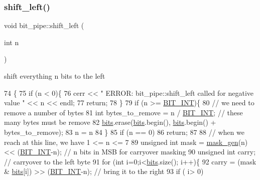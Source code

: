 \subsubsection{\texorpdfstring{shift\+\_\+left()}{shift\_left()}}
{\footnotesize\ttfamily void bit\+\_\+pipe\+::shift\+\_\+left (\begin{DoxyParamCaption}\item[{int}]{n }\end{DoxyParamCaption})}



shift everything n bits to the left 


\begin{DoxyCode}
74                               \{
75   \textcolor{keywordflow}{if} (n < 0)\{
76     cerr << \textcolor{stringliteral}{" ERROR: bit\_pipe::shift\_left called for negative value "} << n << endl;
77     \textcolor{keywordflow}{return};
78   \}
79   \textcolor{keywordflow}{if} (n >= \hyperlink{bitstream_8h_afcadf5aa65c5159bfb96c4d82ebc0a5d}{BIT\_INT})\{
80     \textcolor{comment}{// we need to remove a number of bytes}
81     \textcolor{keywordtype}{int} bytes\_to\_remove = n / \hyperlink{bitstream_8h_afcadf5aa65c5159bfb96c4d82ebc0a5d}{BIT\_INT}; \textcolor{comment}{// these many bytes must be remove}
82     \hyperlink{classbit__pipe_a86f38af1e9736b053728033490476b50}{bits}.erase(\hyperlink{classbit__pipe_a86f38af1e9736b053728033490476b50}{bits}.begin(), \hyperlink{classbit__pipe_a86f38af1e9736b053728033490476b50}{bits}.begin() + bytes\_to\_remove);
83     n = n %
84   \}
85   \textcolor{keywordflow}{if} (n == 0)
86     \textcolor{keywordflow}{return};
87 
88   \textcolor{comment}{// when we reach at this line, we have 1 <= n <= 7}
89   \textcolor{keywordtype}{unsigned} \textcolor{keywordtype}{int} mask = \hyperlink{bitstream_8cpp_a6364b017a9400a38f7a994376bb3ebee}{mask\_gen}(n) << (\hyperlink{bitstream_8h_afcadf5aa65c5159bfb96c4d82ebc0a5d}{BIT\_INT}-n); \textcolor{comment}{// n bits in MSB for carryover masking}
90   \textcolor{keywordtype}{unsigned} \textcolor{keywordtype}{int} carry; \textcolor{comment}{// carryover to the left byte}
91   \textcolor{keywordflow}{for} (\textcolor{keywordtype}{int} i=0;i<\hyperlink{classbit__pipe_a86f38af1e9736b053728033490476b50}{bits}.size(); i++)\{
92     carry = (mask & \hyperlink{classbit__pipe_a86f38af1e9736b053728033490476b50}{bits}[i]) >> (\hyperlink{bitstream_8h_afcadf5aa65c5159bfb96c4d82ebc0a5d}{BIT\_INT}-n); \textcolor{comment}{// bring it to the right}
93     \textcolor{keywordflow}{if} ( i> 0)

\end{DoxyCode}
